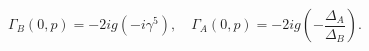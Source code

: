 \begin{equation}
\Gamma_{\!B}(0,p)=-2ig\left(-i\gamma^5\right),\quad
\Gamma_{\!A}(0,p)=-2ig\left(-\frac{\Delta_A}{\Delta_B}\right).
\end{equation}

